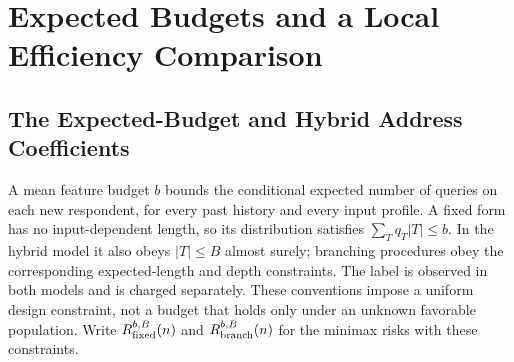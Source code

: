 \section{Expected Budgets and a Local Efficiency Comparison}\label{app:costlocal}
\subsection{The Expected-Budget and Hybrid Address Coefficients}\label{app:expectedproof}
A mean feature budget $b$ bounds the conditional expected number of queries on
each new respondent, for every past history and every input profile. A fixed
form has no input-dependent length, so its distribution satisfies
$\sum_Tq_T|T|\le b$. In the hybrid model it also obeys $|T|\le B$ almost surely;
branching procedures obey the corresponding expected-length and depth
constraints. The label is observed in both models and is charged separately.
These conventions impose a uniform design constraint, not a budget that holds
only under an unknown favorable population. Write $R^{b,B}_{\rm fixed}(n)$ and
$R^{b,B}_{\rm branch}(n)$ for the minimax risks with these constraints.

